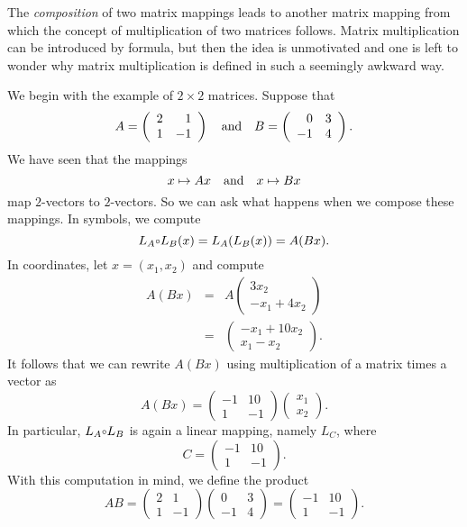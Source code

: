 The {\em composition\/} of two matrix mappings leads to another
matrix mapping from which the concept of multiplication of two
matrices follows.  Matrix multiplication can be introduced by
formula, but then the idea is unmotivated and one is left to
wonder why matrix multiplication is defined in such a seemingly
awkward way.

We begin with the example of $2\times 2$ matrices.  Suppose that
\[
A= \left(\begin{array}{rr} 2 & 1\\ 1 & -1\end{array}\right)
\quad\mbox{and}\quad
B= \left(\begin{array}{rr} 0 & 3\\ -1 & 4\end{array}\right).
\]
We have seen that the mappings
\[
x\mapsto Ax \quad\mbox{and}\quad x\mapsto Bx
\]
map $2$-vectors to $2$-vectors.  So we can ask what happens when
we compose these mappings.  In symbols, we compute
\[
L_A\compose L_B (x) = L_A(L_B(x))= A(Bx).
\]
In coordinates, let $x=(x_1, x_2)$ and compute
\begin{eqnarray*}
A(Bx) & = & A \left(\begin{array}{c} 3x_2 \\ -x_1+4x_2
\end{array}\right)\\
 & = & \left(\begin{array}{c} -x_1+10x_2  \\ x_1-x_2
\end{array}\right).
\end{eqnarray*}
It follows that we can rewrite $A(Bx)$ using multiplication of a
matrix times a vector as
\[
A(Bx) = \left(\begin{array}{rr} -1 & 10 \\ 1 & -1
\end{array}\right)
        \left(\begin{array}{c} x_1 \\ x_2 \end{array} \right).
\]
In particular, $L_A\compose L_B$ is again a linear mapping,
namely $L_C$, where
\[
C =\left(\begin{array}{rr} -1 & 10 \\ 1 & -1 \end{array}\right).
\]
With this computation in mind, we define the product
\[
AB =
\left(\begin{array}{rr} 2 & 1\\ 1 & -1\end{array}\right)
\left(\begin{array}{rr} 0 & 3\\ -1 & 4\end{array}\right)
= \left(\begin{array}{rr} -1 & 10 \\ 1 & -1 \end{array}\right).
\]

